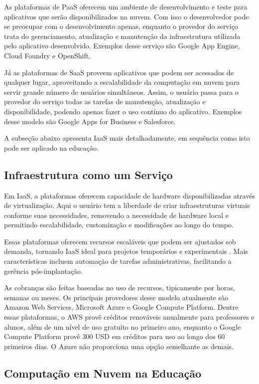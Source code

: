 \documentclass[tg]{mdtufsm}
\begin{document}
As plataformas de PaaS oferecem um ambiente de desenvolvimento e teste para aplicativos que serão disponibilizados na nuvem. Com isso o desenvolvedor pode se preocupar com o desenvolvimento apenas, enquanto o provedor do serviço trata do gerenciamento, atualização e manutenção da infraestrutura utilizada pelo aplicativo desenvolvido. Exemplos desse serviço são Google App Engine, Cloud Foundry e OpenShift.

Já as plataformas de SaaS proveem aplicativos que podem ser acessados de qualquer lugar, aproveitando a escalabilidade da computação em nuvem para servir grande número de usuários simultâneos. Assim, o usuário passa para o provedor do serviço todas as tarefas de manutenção, atualização e disponibilidade, podendo apenas fazer o uso contínuo do aplicativo. Exemplos desse modelo são Google Apps for Business e Salesforce.

A subseção abaixo apresenta IaaS mais detalhadamente, em sequência como isto pode ser aplicado na educação.

\subsection{Infraestrutura como um Serviço}

Em IaaS, a plataformas oferecem capacidade de hardware disponibilizadas através de virtualização. Aqui o usuário tem a liberdade de criar infraestruturas virtuais conforme suas necessidades, removendo a necessidade de hardware local e permitindo escalabilidade, customização e modificações ao longo do tempo.

Essas plataformas oferecem recursos escaláveis que podem ser ajustados sob demanda, tornando IaaS ideal para projetos temporários e experimentais \cite{iaas}. Mais características incluem automação de tarefas administrativas, facilitando a gerência pós-implantação.

As cobranças são feitas baseadas no uso de recursos, tipicamente por horas, semanas ou meses. Os principais provedores desse modelo atualmente são Amazon Web Services, Microsoft Azure e Google Compute Platform. Dentre essas plataformas, o AWS provê créditos renováveis anualmente para professores e alunos, além de um nível de uso gratuito no primeiro ano, enquanto o Google Compute Platform provê 300 USD em créditos para uso ao longo dos 60 primeiros dias. O Azure não proporciona uma opção semelhante as demais.


\subsection{Computação em Nuvem na Educação}
\end{document}
